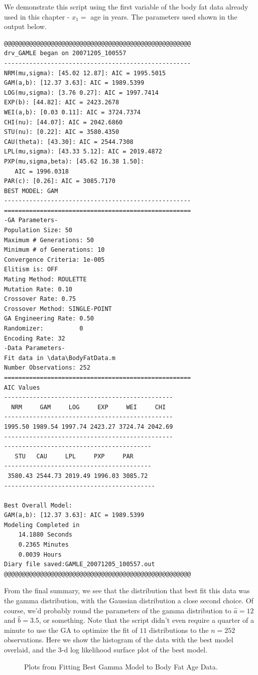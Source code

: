 \documentclass{book}
\begin{document}
We demonstrate this script using the first variable of the body fat data
already used in this chapter - $x_{1}=$ age in years. The parameters used
shown in the output below.
\begin{verbatim}
@@@@@@@@@@@@@@@@@@@@@@@@@@@@@@@@@@@@@@@@@@@@@@@@@@@@
drv_GAMLE began on 20071205_100557
----------------------------------------------------
NRM(mu,sigma): [45.02 12.87]: AIC = 1995.5015
GAM(a,b): [12.37 3.63]: AIC = 1989.5399
LOG(mu,sigma): [3.76 0.27]: AIC = 1997.7414
EXP(b): [44.82]: AIC = 2423.2678
WEI(a,b): [0.03 0.11]: AIC = 3724.7374
CHI(nu): [44.07]: AIC = 2042.6860
STU(nu): [0.22]: AIC = 3580.4350
CAU(theta): [43.30]: AIC = 2544.7308
LPL(mu,sigma): [43.33 5.12]: AIC = 2019.4872
PXP(mu,sigma,beta): [45.62 16.38 1.50]:
   AIC = 1996.0318
PAR(c): [0.26]: AIC = 3085.7170
BEST MODEL: GAM
----------------------------------------------------
====================================================
-GA Parameters-
Population Size: 50
Maximum # Generations: 50
Minimum # of Generations: 10
Convergence Criteria: 1e-005
Elitism is: OFF
Mating Method: ROULETTE
Mutation Rate: 0.10
Crossover Rate: 0.75
Crossover Method: SINGLE-POINT
GA Engineering Rate: 0.50
Randomizer:          0
Encoding Rate: 32
-Data Parameters-
Fit data in \data\BodyFatData.m
Number Observations: 252
====================================================
AIC Values
-----------------------------------------------
  NRM     GAM     LOG     EXP     WEI     CHI
-----------------------------------------------
1995.50 1989.54 1997.74 2423.27 3724.74 2042.69
-----------------------------------------------
-----------------------------------------
   STU   CAU     LPL     PXP     PAR
-----------------------------------------
 3580.43 2544.73 2019.49 1996.03 3085.72
------------------------------------------

Best Overall Model:
GAM(a,b): [12.37 3.63]: AIC = 1989.5399
Modeling Completed in
    14.1880 Seconds
    0.2365 Minutes
    0.0039 Hours
Diary file saved:GAMLE_20071205_100557.out
@@@@@@@@@@@@@@@@@@@@@@@@@@@@@@@@@@@@@@@@@@@@@@@@@@@@
\end{verbatim}
From the final summary, we see that the distribution that best
fit this data was the gamma distribution, with the Gaussian
distribution a close second choice. Of course, we'd probably
round the parameters of the gamma distribution to $\hat{a}=12$
and $\hat{b}=3.5$, or something. Note that the script didn't
even require a quarter of a minute to use the GA to optimize
the fit of $11$ distributions to the $n=252$ observations. Here
we show the histogram of the data with the best model overlaid,
and the 3-d log likelihood surface plot of the best model.
\begin{figure}
\begin{center}
\end{center}
\caption{Plots from Fitting Best Gamma Model to Body Fat Age Data.}
\end{figure}
\end{document}
